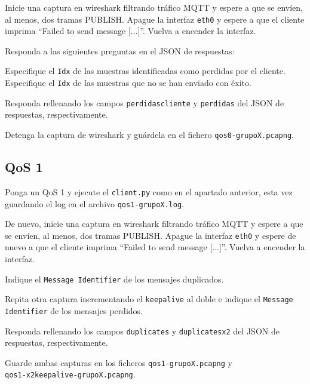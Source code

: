 \documentclass{upmassignment}
\begin{document}
Inicie una
captura en wireshark filtrando
tráfico MQTT y espere a que
se envíen, al menos, dos tramas
PUBLISH. Apague la interfaz
\texttt{eth0} y espere a que
el cliente imprima
``Failed to send message [...]''.
Vuelva a encender la interfaz.


Responda a las siguientes preguntas
en el JSON de respuestas:
\begin{problemlist}
    \pbitem Especifique el \verb|Idx|
        de las muestras identificadas
        como perdidas por el cliente.
    \pbitem Especifique el \verb|Idx|
        de las muestras que no se
        han enviado con éxito.
\end{problemlist}
Responda rellenando los campos
\texttt{perdidascliente} y
\texttt{perdidas} del JSON
de respuestas, respectivamente.

Detenga la captura de wireshark y
guárdela en el fichero
\texttt{qos0-grupoX.pcapng}.


\subsection*{QoS 1}
\noindent
Ponga un QoS 1 y ejecute el \texttt{client.py}
como en el apartado anterior, esta vez
guardando el log en el archivo
\texttt{qos1-grupoX.log}.

De nuevo, inicie una captura en wireshark
filtrando tráfico MQTT y espere a que
se envíen, al menos, dos tramas PUBLISH.
Apague la interfaz \texttt{eth0}
y espere de nuevo a que el cliente
imprima ``Failed to send message [...]''.
Vuelva a encender la interfaz.





\begin{problemlist}
    \setcounter{enumi}{6}
    \pbitem Indique el
        \texttt{Message Identifier}
        de los mensajes duplicados.


    \pbitem Repita otra captura
        incrementando el \texttt{keepalive}
        al doble e indique el
        \texttt{Message Identifier}
        de los mensajes perdidos.

\end{problemlist}
Responda rellenando los campos
\texttt{duplicates} y
\texttt{duplicatesx2} del JSON
de respuestas, respectivamente.

Guarde ambas capturas
en los ficheros
\texttt{qos1-grupoX.pcapng} y\\
\texttt{qos1-x2keepalive-grupoX.pcapng}.
\end{document}
